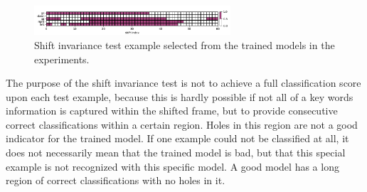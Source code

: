 \begin{figure}[!ht]
  \centering
    \includegraphics[width=0.65\textwidth]{./5_exp/figs/exp_fs_cepstral_tb_shift_conv-jim_mfcc12_norm0}
  \caption{Shift invariance test example selected from the trained models in the experiments.}
  \label{fig:exp_details_tb_shift}
\end{figure}
\FloatBarrier
\noindent
The purpose of the shift invariance test is not to achieve a full classification score upon each test example, because this is hardly possible if not all of a key words information is captured within the shifted frame, but to provide consecutive correct classifications within a certain region.
Holes in this region are not a good indicator for the trained model.
If one example could not be classified at all, it does not necessarily mean that the trained model is bad, but that this special example is not recognized with this specific model.
A good model has a long region of correct classifications with no holes in it.



